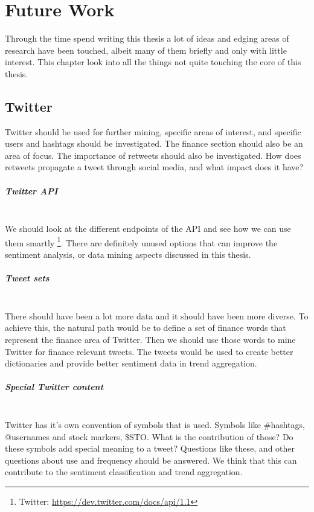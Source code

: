 \chapter{Future Work}\label{future_work}
Through the time spend writing this thesis a lot of ideas and edging areas of
research have been touched, albeit many of them briefly and only with
little interest. This chapter look into all the things not
quite touching the core of this thesis.
%

\section{Twitter}\label{future_work:twitter}
Twitter should be used for further mining, specific areas of interest, and
specific users and hashtags should be investigated. 
The finance section should also be an area of focus. 
The importance of retweets should also be investigated. How does retweets
propagate a tweet through social media, and what impact does it have?

\paragraph{Twitter API}
\hspace{0pt}\\
We should look at the different endpoints of the API and see how we can
use them smartly \footnote{Twitter: \url{https://dev.twitter.com/docs/api/1.1}}.
There are definitely unused options that can improve the sentiment analysis, or
data mining aspects discussed in this thesis. 

\paragraph{Tweet sets}
\hspace{0pt}\\
There should have been a lot more data and it should have been more diverse. To
achieve this, the natural path would be to define a set of finance words that
represent the finance area of Twitter. Then we should use those words to mine
Twitter for finance relevant tweets. The tweets would be used to create better
dictionaries and provide better sentiment data in trend aggregation.  

\paragraph{Special Twitter content}
\hspace{0pt}\\
Twitter has it's own convention of symbols that is used. Symbols like \#hashtags,
@usernames and stock markers, \$STO. What is the contribution of those? Do these
symbols add special meaning to a tweet? Questions like these, and other
questions about use and frequency should be answered. We think that this can
contribute to the sentiment classification and trend aggregation. 

